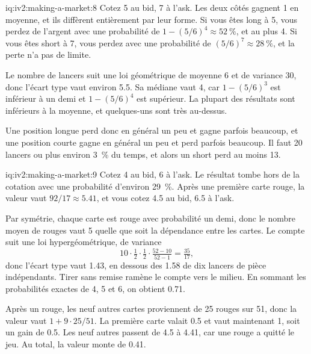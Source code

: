 \begin{solution}{iq:iv2:making-a-market:8}
Cotez 5 au bid, 7 à l'ask. Les deux côtés gagnent 1 en moyenne, et ils diffèrent entièrement par leur forme. Si vous êtes long à 5, vous perdez de l'argent avec une probabilité de $1 - (5/6)^4 \approx 52~\%$, et au plus 4. Si vous êtes short à 7, vous perdez avec une probabilité de $(5/6)^7 \approx 28~\%$, et la perte n'a pas de limite.

Le nombre de lancers suit une loi géométrique de moyenne 6 et de variance 30, donc l'écart type vaut environ 5.5. Sa médiane vaut 4, car $1 - (5/6)^3$ est inférieur à un demi et $1 - (5/6)^4$ est supérieur. La plupart des résultats sont inférieurs à la moyenne, et quelques-uns sont très au-dessus.

Une position longue perd donc en général un peu et gagne parfois beaucoup, et une position courte gagne en général un peu et perd parfois beaucoup. Il faut 20 lancers ou plus environ 3~\% du temps, et alors un short perd au moins 13.

\end{solution}

\begin{solution}{iq:iv2:making-a-market:9}
Cotez 4 au bid, 6 à l'ask. Le résultat tombe hors de la cotation avec une probabilité d'environ 29~\%. Après une première carte rouge, la valeur vaut $92/17 \approx 5.41$, et vous cotez 4.5 au bid, 6.5 à l'ask.

Par symétrie, chaque carte est rouge avec probabilité un demi, donc le nombre moyen de rouges vaut 5 quelle que soit la dépendance entre les cartes. Le compte suit une loi hypergéométrique, de variance
\[
10 \cdot \tfrac12 \cdot \tfrac12 \cdot \tfrac{52 - 10}{52 - 1} = \tfrac{35}{17},
\]
donc l'écart type vaut 1.43, en dessous des 1.58 de dix lancers de pièce indépendants. Tirer sans remise ramène le compte vers le milieu. En sommant les probabilités exactes de 4, 5 et 6, on obtient 0.71.

Après un rouge, les neuf autres cartes proviennent de 25 rouges sur 51, donc la valeur vaut $1 + 9 \cdot 25/51$. La première carte valait 0.5 et vaut maintenant 1, soit un gain de 0.5. Les neuf autres passent de 4.5 à 4.41, car une rouge a quitté le jeu. Au total, la valeur monte de 0.41.

\end{solution}

